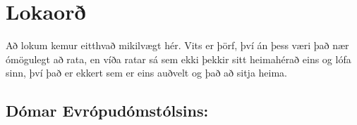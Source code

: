 \documentclass[a4paper, 12pt]{article}
\begin{document}
\section{Lokaorð}
Að lokum kemur eitthvað mikilvægt hér. Vits er þörf, því án þess væri það nær ómögulegt að rata, en víða ratar sá sem ekki þekkir sitt heimahérað eins og lófa sinn, því það er ekkert sem er eins auðvelt og það að sitja heima.

\newpage
\nolinenumbers
\printbibliography[heading=bibintoc, notkeyword=courtcase, notkeyword=eu, title={HEIMILDASKRÁ}]

\newpage
\printbibliography[keyword=courtcase, heading=bibcourt, env=italicbib]
\subsection*{\normalfont Dómar Evrópudómstólsins:}\vspace{-1em}
\printbibliography[keyword=eu, heading=empty, env=italicbib]
\end{document}
